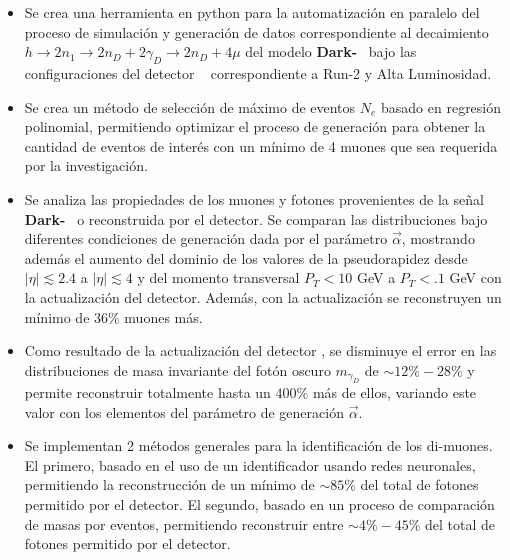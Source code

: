 \begin{itemize}
\item Se crea una herramienta en \textsf{python} para la automatización en paralelo del proceso de simulación y generación de datos correspondiente al decaimiento $h \rightarrow 2n_1 \rightarrow 2n_D + 2\gamma_D \rightarrow 2n_D + 4\mu$ del modelo \textbf{Dark-}\SUSY ~ bajo las configuraciones del detector \CMS ~ correspondiente a Run-2 y Alta Luminosidad.
\item Se crea un método de selección de máximo de eventos $N_e$ basado en regresión polinomial, permitiendo optimizar el proceso de generación para obtener la cantidad de eventos de interés con un mínimo de 4 muones que sea requerida por la investigación. 
\item Se analiza las propiedades de los muones y fotones provenientes de la señal \textbf{Dark-}\SUSY ~ o reconstruida por el detector. Se comparan las distribuciones bajo diferentes condiciones de generación dada por el parámetro $\vec{\alpha}$, mostrando además el aumento del dominio de los valores de la pseudorapidez desde $|\eta|\lesssim 2.4$ a $|\eta|\lesssim 4$ y del momento transversal $P_T<10$ GeV a $P_T<.1$ GeV con la actualización del detector. Además, con la actualización se 
reconstruyen un mínimo de $36\%$ muones más. 
\item Como resultado de la actualización del detector \CMS, se disminuye el error en las distribuciones de masa invariante del fotón oscuro $m_{\gamma_D}$ de $\sim 12\% - 28\%$ y permite reconstruir totalmente hasta un $400\%$ más de ellos, variando este valor con los elementos del parámetro de generación $\vec{\alpha}$.

\item Se implementan 2 métodos generales para la identificación de los di-muones. El primero, basado en el uso de un identificador usando redes neuronales, permitiendo la reconstrucción de un mínimo de $\sim 85\%$ del total de fotones permitido por el detector. El segundo, basado en un proceso de comparación de masas por eventos, permitiendo reconstruir entre $\sim 4\%-45\%$ del total de fotones permitido por el detector. 
\end{itemize}